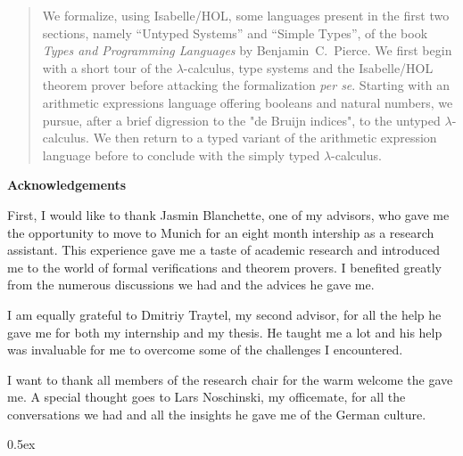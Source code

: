 \documentclass[12pt,a4paper,titlepage,oneside]{article}
\makeatletter
\newcommand\ackname{Acknowledgements}
\newenvironment{acknowledgements}{%
      \titlepage
      \null\vfil
      \@beginparpenalty\@lowpenalty
      \begin{center}%
        \bfseries \ackname
        \@endparpenalty\@M
      \end{center}}%
     {\par\vfil\null\endtitlepage}
\newenvironment{acknowledgements}{%
      \if@twocolumn
        \section*{\abstractname}%
      \else
        \small
        \begin{center}%
          {\bfseries \ackname\vspace{-.5em}\vspace{\z@}}%
        \end{center}%
        \quotation
      \fi}
      {\if@twocolumn\else\endquotation\fi}
\makeatother
\begin{document}
\begin{abstract}
We formalize, using Isabelle/HOL, some languages present in the first two sections, namely ``Untyped
Systems'' and ``Simple Types'', of the book \emph{Types and Programming Languages} by
Benjamin~C.~Pierce. We first begin with a short tour of the $\lambda$-calculus, type systems and the
Isabelle/HOL theorem prover before attacking the formalization \emph{per se}. Starting with an
arithmetic expressions language offering booleans and natural numbers, we pursue, after a brief
digression to the "de Bruijn indices", to the untyped $\lambda$-calculus. We then return to a typed
variant of the arithmetic expression language before to conclude with the simply typed
$\lambda$-calculus.
\end{abstract}

\newpage
\null
\newpage

\begin{acknowledgements}
  First, I would like to thank Jasmin Blanchette, one of my advisors, who gave me the opportunity to
  move to Munich for an eight month intership as a research assistant. This experience gave me a
  taste of academic research and introduced me to the world of formal verifications and theorem
  provers. I benefited greatly from the numerous discussions we had and the advices he gave me.

  I am equally grateful to Dmitriy Traytel, my second advisor, for all the help he gave me for
  both my internship and my thesis. He taught me a lot and his help was invaluable for me to
  overcome some of the challenges I encountered.

  I want to thank all members of the research chair for the warm welcome the gave me. A special
  thought goes to Lars Noschinski, my officemate, for all the conversations we had and all the
  insights he gave me of the German culture.
\end{acknowledgements}

\newpage
\null
\newpage

\tableofcontents

\newpage
\null
\newpage

\pagestyle{headings}





\parindent 0pt\parskip 0.5ex










\nocite{*}



%
%
\end{document}
